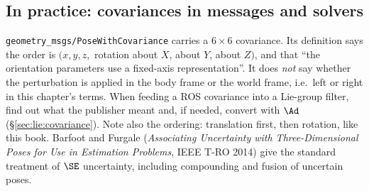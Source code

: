 \subsection{In practice: covariances in messages and solvers}\label{sec:lie:uncertainty-in-practice}

\texttt{geometry\_msgs/PoseWithCovariance} carries a $6\times6$ covariance. Its definition says the order is $(x,y,z,$ rotation about $X$, about $Y$, about $Z)$, and that ``the orientation parameters use a fixed-axis representation''. It does \emph{not} say whether the perturbation is applied in the body frame or the world frame, i.e.\ left or right in this chapter's terms. When feeding a ROS covariance into a Lie-group filter, find out what the publisher meant and, if needed, convert with $\Ad$ (\S\ref{sec:lie:covariance}). Note also the ordering: translation first, then rotation, like this book. Barfoot and Furgale (\emph{Associating Uncertainty with Three-Dimensional Poses for Use in Estimation Problems}, IEEE T-RO 2014) give the standard treatment of $\SE$ uncertainty, including compounding and fusion of uncertain poses.
